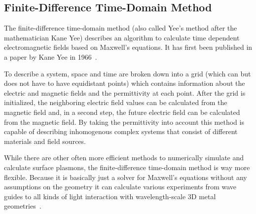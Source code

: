 \subsection{Finite-Difference Time-Domain Method}

The finite-difference time-domain method (also called Yee's method after the mathematician Kane Yee) describes an algorithm to calculate time dependent electromagnetic fields based on Maxwell's equations. It has first been published in a paper by Kane Yee in 1966~\cite{yee}.

To describe a system, space and time are broken down into a grid (which can but does not have to have equidistant points) which contains information about the electric and magnetic fields and the permittivity at each point. After the grid is initialized, the neighboring electric field values can be calculated from the magnetic field and, in a second step, the future electric field can be calculated from the magnetic field. By taking the permittivity into account this method is capable of describing inhomogenous complex systems that consist of different materials and field sources.

While there are other often more efficient methods to numerically simulate and calculate surface plasmons, the finite-difference time-domain method is way more flexible. Because it is basically just a solver for Maxwell's equations without any assumptions on the geometry it can calculate various experiments from wave guides to all kinds of light interaction with wavelength-scale 3D metal geometries~\cite{numel}.
